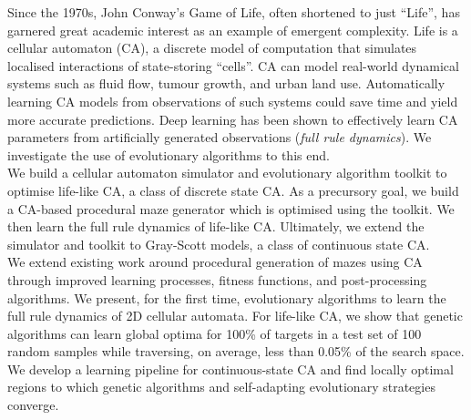 
Since the 1970s, John Conway's Game of Life, often shortened to just ``Life'', has garnered great academic interest as an example of emergent complexity. Life is a cellular automaton (CA), a discrete model of computation that simulates localised interactions of state-storing ``cells''. CA can model real-world dynamical systems such as fluid flow\cite{wolf2004lattice}, tumour growth\cite{reher2017cell}, and urban land use\cite{white2000high}. Automatically learning CA models from observations of such systems could save time and yield more accurate predictions. Deep learning has been shown to effectively learn CA parameters from artificially generated observations (\textit{full rule dynamics})\cite{wulff1992learning}. We investigate the use of evolutionary algorithms to this end.\\

We build a cellular automaton simulator and evolutionary algorithm toolkit to optimise life-like CA, a class of discrete state CA. As a precursory goal, we build a CA-based procedural maze generator which is optimised using the toolkit. We then learn the full rule dynamics of life-like CA. Ultimately, we extend the simulator and toolkit to Gray-Scott models\cite{gray1983autocatalytic}, a class of continuous state CA.\\

We extend existing work around procedural generation of mazes using CA\cite{adams2017procedural} through improved learning processes, fitness functions, and post-processing algorithms. We present, for the first time, evolutionary algorithms to learn the full rule dynamics of 2D cellular automata. For life-like CA, we show that genetic algorithms can learn global optima for 100\% of targets in a test set of 100 random samples while traversing, on average, less than 0.05\% of the search space. We develop a learning pipeline for continuous-state CA and find locally optimal regions to which genetic algorithms and self-adapting evolutionary strategies converge.